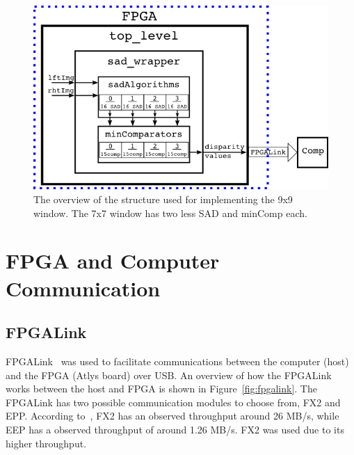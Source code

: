 \begin{figure}[h]
	\begin{center}
		\includegraphics[width=150mm]{figures/top_level_rtl.png}
		\captionfonts
		\caption{The overview of the structure used for implementing the 9x9 window. The 7x7 window has two less SAD and minComp each.}
		\label{fig:topLevel_rtl}
	\end{center}
\end{figure}


\section{FPGA and Computer Communication}

\subsection{FPGALink}
\label{sec:fpgalink}

FPGALink~\cite{fpgalink} was used to facilitate communications between the computer (host) and the FPGA (Atlys board) over USB. An overview of how the FPGALink works between the host and FPGA is shown in Figure~\ref{fig:fpgalink}. The FPGALink has two possible communication modules to choose from, FX2 and EPP. According to~\cite{fpgalink}, FX2 has an observed throughput around 26 MB/s, while EEP has a observed throughput of around 1.26 MB/s. FX2 was used due to its higher throughput.

